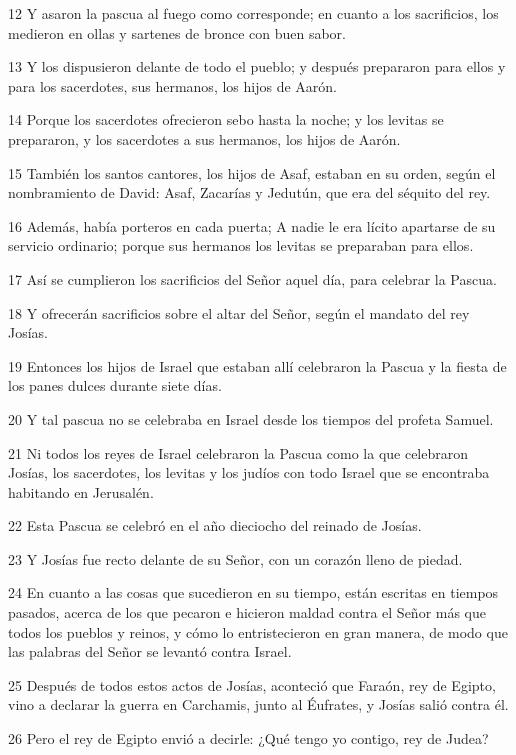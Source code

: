 \par 12 Y asaron la pascua al fuego como corresponde; en cuanto a los sacrificios, los medieron en ollas y sartenes de bronce con buen sabor.
\par 13 Y los dispusieron delante de todo el pueblo; y después prepararon para ellos y para los sacerdotes, sus hermanos, los hijos de Aarón.
\par 14 Porque los sacerdotes ofrecieron sebo hasta la noche; y los levitas se prepararon, y los sacerdotes a sus hermanos, los hijos de Aarón.
\par 15 También los santos cantores, los hijos de Asaf, estaban en su orden, según el nombramiento de David: Asaf, Zacarías y Jedutún, que era del séquito del rey.
\par 16 Además, había porteros en cada puerta; A nadie le era lícito apartarse de su servicio ordinario; porque sus hermanos los levitas se preparaban para ellos.
\par 17 Así se cumplieron los sacrificios del Señor aquel día, para celebrar la Pascua.
\par 18 Y ofrecerán sacrificios sobre el altar del Señor, según el mandato del rey Josías.
\par 19 Entonces los hijos de Israel que estaban allí celebraron la Pascua y la fiesta de los panes dulces durante siete días.
\par 20 Y tal pascua no se celebraba en Israel desde los tiempos del profeta Samuel.
\par 21 Ni todos los reyes de Israel celebraron la Pascua como la que celebraron Josías, los sacerdotes, los levitas y los judíos con todo Israel que se encontraba habitando en Jerusalén.
\par 22 Esta Pascua se celebró en el año dieciocho del reinado de Josías.
\par 23 Y Josías fue recto delante de su Señor, con un corazón lleno de piedad.
\par 24 En cuanto a las cosas que sucedieron en su tiempo, están escritas en tiempos pasados, acerca de los que pecaron e hicieron maldad contra el Señor más que todos los pueblos y reinos, y cómo lo entristecieron en gran manera, de modo que las palabras del Señor se levantó contra Israel.
\par 25 Después de todos estos actos de Josías, aconteció que Faraón, rey de Egipto, vino a declarar la guerra en Carchamis, junto al Éufrates, y Josías salió contra él.
\par 26 Pero el rey de Egipto envió a decirle: ¿Qué tengo yo contigo, rey de Judea?
